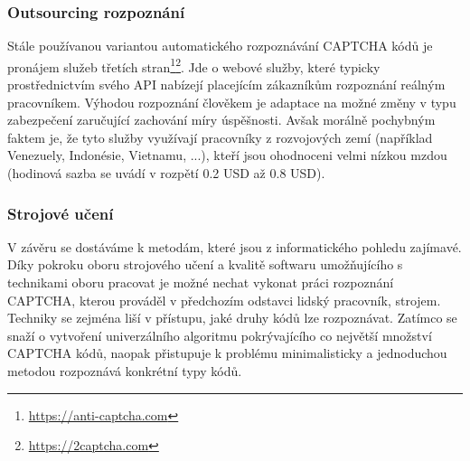 \documentclass[
  field=ainfp,
  master=true,
  biblatex,
  sourcecodes=false,
  theorems=false,
  glossaries,
  index
]{kidiplom}
\begin{document}
\subsubsection*{Outsourcing rozpoznání}
Stále používanou variantou automatického rozpoznávání CAPTCHA kódů je pronájem služeb třetích stran\footnote{\url{https://anti-captcha.com}}\footnote{\url{https://2captcha.com}}. Jde o webové služby, které typicky prostřednictvím svého API nabízejí placejícím zákazníkům rozpoznání reálným pracovníkem. Výhodou rozpoznání člověkem je adaptace na možné změny v typu zabez\-pe\-čení zaručující zachování míry úspěšnosti. Avšak morálně pochybným faktem je, že tyto služby využívají pracovníky z rozvojových zemí (například Venezuely, Indonésie, Vietnamu, ...), kteří jsou ohodnoceni velmi nízkou mzdou (hodinová sazba se uvádí v rozpětí 0.2 USD až 0.8 USD). 

\subsubsection*{Strojové učení}
V závěru se dostáváme k metodám, které jsou z informatického pohledu zajímavé. Díky pokroku oboru strojového učení a kvalitě softwaru umožňujícího s technikami oboru pracovat je možné nechat vykonat práci rozpoznání CAPTCHA, kterou prováděl v předchozím odstavci lidský pracovník, strojem. Techniky se zejména liší v přístupu, jaké druhy kódů lze rozpoznávat. Zatímco \cite{43464} se snaží o vytvoření univerzálního algoritmu pokrývajícího co největší množství CAPTCHA kódů, \citep{Kopp2016HowTM} naopak přistupuje k problému minimalisticky a jednoduchou metodou rozpoznává konkrétní typy kódů.
\newpage
\end{document}

